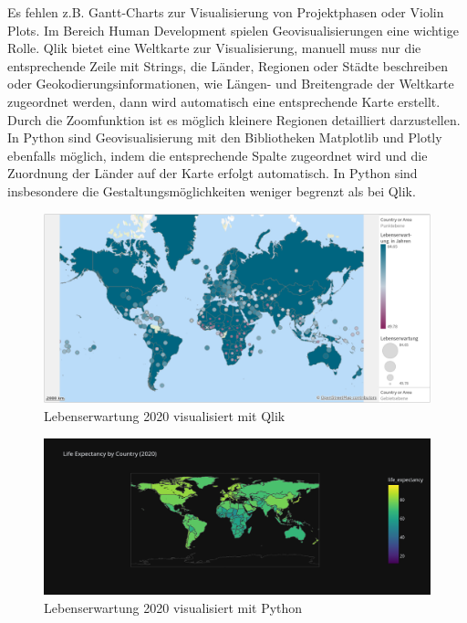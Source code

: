 \documentclass[12pt]{article}
\begin{document}
	Es fehlen z.B. Gantt-Charts zur Visualisierung von Projektphasen oder Violin Plots.
	Im Bereich Human Development spielen Geovisualisierungen eine wichtige Rolle. Qlik bietet eine Weltkarte zur Visualisierung, manuell muss nur die entsprechende Zeile mit Strings, die Länder, Regionen oder Städte beschreiben oder Geokodierungsinformationen, wie Längen- und Breitengrade der Weltkarte zugeordnet werden, dann wird automatisch eine entsprechende Karte erstellt. Durch die Zoomfunktion ist es möglich kleinere Regionen detailliert darzustellen. In Python sind Geovisualisierung mit den Bibliotheken Matplotlib und Plotly ebenfalls möglich, indem die entsprechende Spalte zugeordnet wird und die Zuordnung der Länder auf der Karte erfolgt automatisch. In Python sind insbesondere die Gestaltungsmöglichkeiten weniger begrenzt als bei Qlik.
	\begin{figure}[h]
		\centering
		\includegraphics[width=1.0\textwidth]{life_exp_qlik}
		\caption{Lebenserwartung 2020 visualisiert mit Qlik}
	\end{figure}
	\begin{figure}[h]
		\centering
		\includegraphics[width=1.0\textwidth]{life_exp_python}
		\caption{Lebenserwartung 2020 visualisiert mit Python}
	\end{figure}
	
\end{document}
